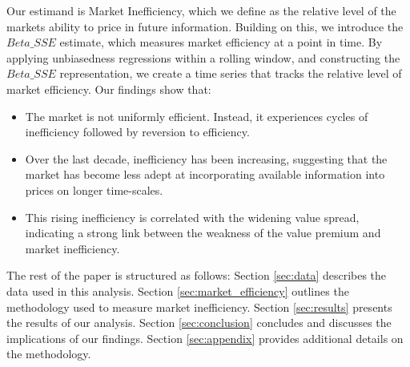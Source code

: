 Our estimand is Market Inefficiency, which we define as the relative level of the markets ability to price in future information.
Building on this, we introduce the \textit{$Beta\_SSE$} estimate, which measures market efficiency at a point in time. 
By applying unbiasedness regressions within a rolling window, and constructing the \textit{$Beta\_SSE$} representation, we create a time series that tracks the relative level of market 
efficiency. \newline
\newline
Our findings show that:
\begin{itemize}
    \item The market is not uniformly efficient. Instead, it experiences cycles of inefficiency followed by reversion to efficiency.
    \item Over the last decade, inefficiency has been increasing, suggesting that the market has become less adept at incorporating available information into prices on longer time-scales.
    \item This rising inefficiency is correlated with the widening value spread, indicating a strong link between the weakness of the value premium and market inefficiency.
\end{itemize}

The rest of the paper is structured as follows: Section \ref{sec:data} describes the data used in this analysis. Section \ref{sec:market_efficiency} outlines the methodology used to measure market inefficiency.
Section \ref{sec:results} presents the results of our analysis. Section \ref{sec:conclusion} concludes and discusses the implications of our findings. 
Section \ref{sec:appendix} provides additional details on the methodology.